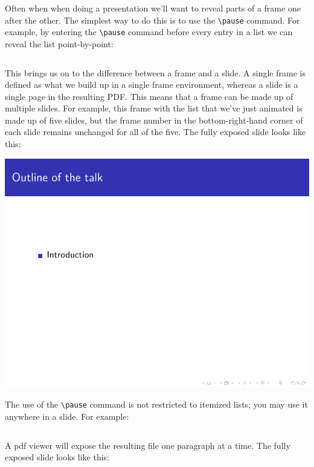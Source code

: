 \begin{column}{0.5\textwidth}
Often when when doing a presentation we'll want to reveal parts of a frame one after the other. The simplest way to do this is to use the \verb|\pause| command. For example, by entering the \verb|\pause| command before every entry in a list we can reveal the list point-by-point:

\inputminted[linenos=true]{latex}{examples/beamer/beameroverlay01.tex}

This brings us on to the difference between a frame and a slide. A single frame is defined as what we build up in a single frame environment, whereas a slide is a single page in the resulting PDF. This means that a frame can be made up of multiple slides. For example, this frame with the list that we've just animated is made up of five slides, but the frame number in the bottom-right-hand corner of each slide remains unchanged for all of the five.
The fully exposed slide looks like this:

\includegraphics[page=5]{examples/beamer/beameroverlay01.pdf}

The use of the \verb|\pause| command is not restricted to itemized lists; you may use it anywhere in a slide. For example:

\inputminted[linenos=true]{latex}{examples/beamer/beameroverlay02.tex}

A pdf viewer will expose the resulting file one paragraph at a time. The fully exposed slide looks like this:


\end{column}
